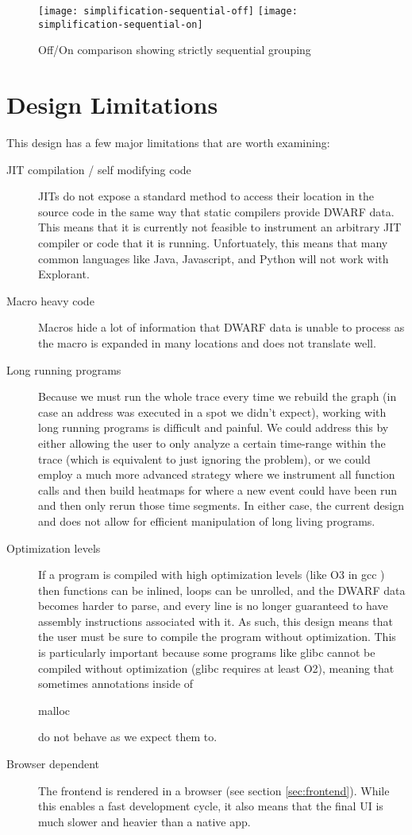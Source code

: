 \begin{figure}[!ht]
\centering
\texttt{[image: simplification-sequential-off]}
\texttt{[image: simplification-sequential-on]}
\caption{Off/On comparison showing strictly sequential grouping}
    \label{fig:seq-on-off}
\end{figure}


\section{Design Limitations}
\label{sec:design-limitations}

\noindent This design has a few major limitations that are worth examining:

\begin{description}
    \item[JIT compilation / self modifying code] JITs \cite{jit} do not expose a standard method to access their location in the source code in the same way that static compilers provide DWARF data. This means that it is currently not feasible to instrument an arbitrary JIT compiler or code that it is running. Unfortuately, this means that many common languages like Java, Javascript, and Python will not work with Explorant.
\item[Macro heavy code] Macros hide a lot of information that DWARF data is unable to process as the macro is expanded in many locations and does not translate well. 
\item[Long running programs] Because we must run the whole trace every time we rebuild the graph (in case an address was executed in a spot we didn't expect), working with long running programs is difficult and painful. We could address this by either allowing the user to only analyze a certain time-range within the trace (which is equivalent to just ignoring the problem), or we could employ a much more advanced strategy where we instrument all function calls and then build heatmaps for where a new event could have been run and then only rerun those time segments. In either case, the current design and does not allow for efficient manipulation of long living programs. 
\item[Optimization levels] If a program is compiled with high optimization levels (like O3 in gcc \cite{gcc}) then functions can be inlined, loops can be unrolled, and the DWARF data becomes harder to parse, and every line is no longer guaranteed to have assembly instructions associated with it. As such, this design means that the user must be sure to compile the program without optimization. This is particularly important because some programs like glibc cannot be compiled without optimization (glibc requires at least O2), meaning that sometimes annotations inside of \begin{tt}malloc\end{tt} do not behave as we expect them to. 
    \item[Browser dependent] The frontend is rendered in a browser (see section \ref{sec:frontend}). While this enables a fast development cycle, it also means that the final UI is much slower and heavier than a native app. 

\end{description}
